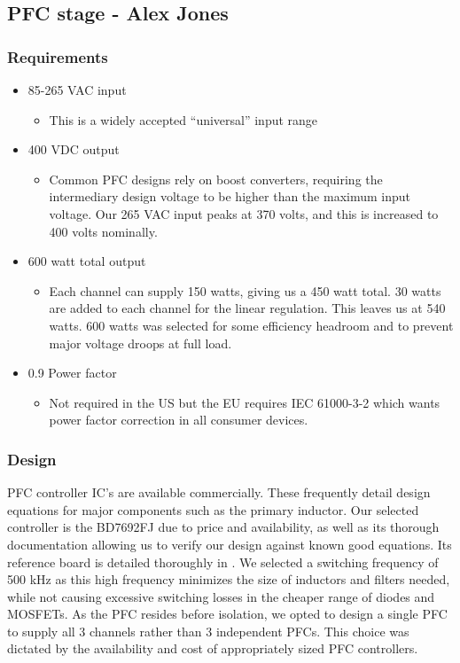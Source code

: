 \documentclass[15pt]{article}
\begin{document}
\subsection{PFC stage  - Alex Jones}
\subsubsection{Requirements}
\begin{itemize}
\item 85-265 VAC input \begin{itemize}
    \item This is a widely accepted “universal” input range
\end{itemize}
\item 400 VDC output \begin{itemize}
    \item Common PFC designs rely on boost converters, requiring the intermediary design voltage to be higher than the maximum input voltage. Our 265 VAC input peaks at 370 volts, and this is increased to 400 volts nominally.
\end{itemize}
\item 600 watt total output \begin{itemize}
    \item Each channel can supply 150 watts, giving us a 450 watt total. 30 watts are added to each channel for the linear regulation. This leaves us at 540 watts. 600 watts was selected for some efficiency headroom and to prevent major voltage droops at full load.
\end{itemize}
\item 0.9 Power factor \begin{itemize}
    \item Not required in the US but the EU requires IEC 61000-3-2\cite{4} which wants power factor correction in all consumer devices. 
\end{itemize}
\end{itemize}


\subsubsection{Design}
PFC controller IC’s are available commercially. These frequently detail design equations for major components such as the primary inductor. Our selected controller is the BD7692FJ due to price and availability, as well as its thorough documentation allowing us to verify our design against known good equations. Its reference board is detailed thoroughly in \cite{1}. We selected a switching frequency of 500 kHz as this high frequency minimizes the size of inductors and filters needed, while not causing excessive switching losses in the cheaper range of diodes and MOSFETs. As the PFC resides before isolation, we opted to design a single PFC to supply all 3 channels rather than 3 independent PFCs. This choice was dictated by the availability and cost of appropriately sized PFC controllers.
\end{document}
